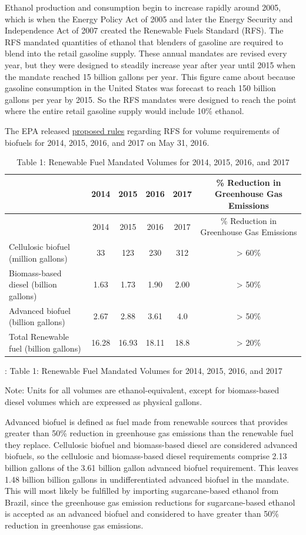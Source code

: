 \documentclass[]{book}
\theoremstyle{definition}
\theoremstyle{definition}
\theoremstyle{remark}
\begin{document}
Ethanol production and consumption begin to increase rapidly around
2005, which is when the Energy Policy Act of 2005 and later the Energy
Security and Independence Act of 2007 created the Renewable Fuels
Standard (RFS). The RFS mandated quantities of ethanol that blenders of
gasoline are required to blend into the retail gasoline supply. These
annual mandates are revised every year, but they were designed to
steadily increase year after year until 2015 when the mandate reached 15
billion gallons per year. This figure came about because gasoline
consumption in the United States was forecast to reach 150 billion
gallons per year by 2015. So the RFS mandates were designed to reach the
point where the entire retail gasoline supply would include 10\%
ethanol.

The EPA released
\href{https://www.epa.gov/renewable-fuel-standard-program/proposed-renewable-fuel-standards-2017-and-biomass-based-diesel}{proposed
rules} regarding RFS for volume requirements of biofuels for 2014, 2015,
2016, and 2017 on May 31, 2016.

\begin{longtable}[]{@{}lccccc@{}}
\caption{Table 1: Renewable Fuel Mandated Volumes for 2014, 2015, 2016,
and 2017}\tabularnewline
\toprule
& 2014 & 2015 & 2016 & 2017 & \% Reduction in Greenhouse Gas
Emissions\tabularnewline
\midrule
\endfirsthead
\toprule
& 2014 & 2015 & 2016 & 2017 & \% Reduction in Greenhouse Gas
Emissions\tabularnewline
\midrule
\endhead
Cellulosic biofuel (million gallons) & 33 & 123 & 230 & 312 &
\textgreater{} 60\%\tabularnewline
Biomass-based diesel (billion gallons) & 1.63 & 1.73 & 1.90 & 2.00 &
\textgreater{} 50\%\tabularnewline
Advanced biofuel (billion gallons) & 2.67 & 2.88 & 3.61 & 4.0 &
\textgreater{} 50\%\tabularnewline
Total Renewable fuel (billion gallons) & 16.28 & 16.93 & 18.11 & 18.8 &
\textgreater{} 20\%\tabularnewline
\bottomrule
\end{longtable}

: Table 1: Renewable Fuel Mandated Volumes for 2014, 2015, 2016, and
2017

Note: Units for all volumes are ethanol-equivalent, except for
biomass-based diesel volumes which are expressed as physical
gallons.\textbar{}

Advanced biofuel is defined as fuel made from renewable sources that
provides greater than 50\% reduction in greenhouse gas emissions than
the renewable fuel they replace. Cellulosic biofuel and biomass-based
diesel are considered advanced biofuels, so the cellulosic and
biomass-based diesel requirements comprise 2.13 billion gallons of the
3.61 billion gallon advanced biofuel requirement. This leaves 1.48
billion billion gallons in undifferentiated advanced biofuel in the
mandate. This will most likely be fulfilled by importing sugarcane-based
ethanol from Brazil, since the greenhouse gas emission reductions for
sugarcane-based ethanol is accepted as an advanced biofuel and
considered to have greater than 50\% reduction in greenhouse gas
emissions.
\end{document}

